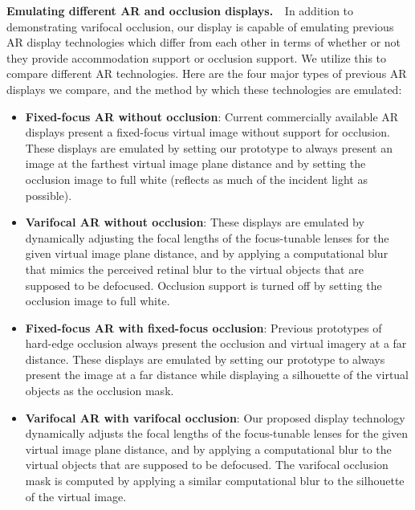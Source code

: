 {\bf Emulating different AR and occlusion displays. $\,\,$}
In addition to demonstrating varifocal occlusion, our display is capable of emulating previous AR display technologies which differ from each other in terms of whether or not they provide accommodation support or occlusion support. We utilize this to compare different AR technologies. Here are the four major types of previous AR displays we compare, and the method by which these technologies are emulated: 
\begin{itemize}
\item \textbf{Fixed-focus AR without occlusion}: Current commercially available AR displays present a fixed-focus virtual image without support for occlusion. These displays are emulated by setting our prototype to always present an image at the farthest virtual image plane distance and by setting the occlusion image to full white (reflects as much of the incident light as possible).
\item \textbf{Varifocal AR without occlusion}: These displays are emulated by dynamically adjusting the focal lengths of the focus-tunable lenses for the given virtual image plane distance, and by applying a computational blur that mimics the perceived retinal blur to the virtual objects that are supposed to be defocused. Occlusion support is turned off by setting the occlusion image to full white.
\item \textbf{Fixed-focus AR with fixed-focus occlusion}: Previous prototypes of hard-edge occlusion always present the occlusion and virtual imagery at a far distance. These displays are emulated by setting our prototype to always present the image at a far distance while displaying a silhouette of the virtual objects as the occlusion mask.
\item \textbf{Varifocal AR with varifocal occlusion}: Our proposed display technology dynamically adjusts the focal lengths of the focus-tunable lenses for the given virtual image plane distance, and by applying a computational blur to the virtual objects that are supposed to be defocused. The varifocal occlusion mask is computed by applying a similar computational blur to the silhouette of the virtual image.
\end{itemize}


